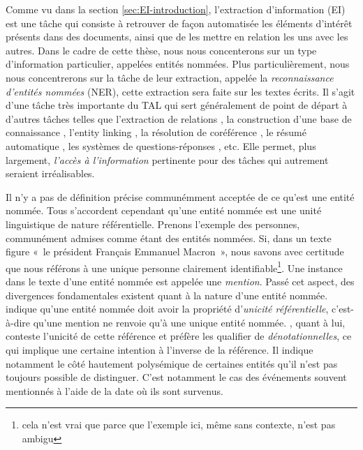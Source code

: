 \documentclass[PhD-Yoann-Dupont.tex]{subfiles}
\begin{document}
Comme vu dans la section \ref{sec:EI-introduction}, l'extraction d'information (EI) est une tâche qui consiste à retrouver de façon automatisée les éléments d'intérêt présents dans des documents, ainsi que de les mettre en relation les uns avec les autres. Dans le cadre de cette thèse, nous nous concenterons sur un type d'information particulier, appelées entités nommées. Plus particulièrement, nous nous concentrerons sur la tâche de leur extraction, appelée la \emph{reconnaissance d'entités nommées} (NER), cette extraction sera faite sur les textes écrits. Il s'agit d'une tâche très importante du TAL qui sert généralement de point de départ à d'autres tâches telles que l'extraction de relations \citep{bunescu2005}, la construction d'une base de connaissance \citep{surdeanu2013overview}, l'entity linking \citep{doddington2004automatic}, la résolution de coréférence \citep{denis2009global,durrett2014joint,hajishirzi2013joint}, le résumé automatique \cite{gupta2011named}, les systèmes de questions-réponses \citep{han2017answer}, etc. Elle permet, plus largement, \emph{l'accès à l'information} \citep{nouvel2015entites} pertinente pour des tâches qui autrement seraient irréalisables.

Il n'y a pas de définition précise communémment acceptée de ce qu'est une entité nommée. Tous s'accordent cependant qu'une entité nommée est une unité linguistique de nature référentielle. Prenons l'exemple des personnes, communément admises comme étant des entités nommées. Si, dans un texte figure «\ le président Français Emmanuel Macron\ », nous savons avec certitude que nous référons à une unique personne clairement identifiable\footnote{cela n'est vrai que parce que l'exemple ici, même sans contexte, n'est pas ambigu}. Une instance dans le texte d'une entité nommée est appelée une \emph{mention}. Passé cet aspect, des divergences fondamentales existent quant à la nature d'une entité nommée. \citet{linguistic2005ace} indique qu'une entité nommée doit avoir la propriété d'\emph{unicité référentielle}, c'est-à-dire qu'une mention ne renvoie qu'à une unique entité nommée. \citet{poibeau2005statut}, quant à lui, conteste l'unicité de cette référence et préfère les qualifier de \emph{dénotationnelles}, ce qui implique une certaine intention à l'inverse de la référence. Il indique notamment le côté hautement polysémique de certaines entités qu'il n'est pas toujours possible de distinguer. C'est notamment le cas des événements souvent mentionnés à l'aide de la date où ils sont survenus.
\end{document}
